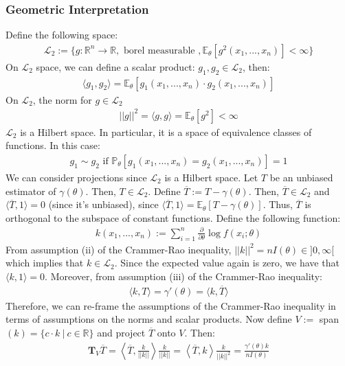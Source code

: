 \documentclass[11pt]{scrartcl}
\newcommand{\R}[0]{\mathbb{R}}
\theoremstyle{definition}
\theoremstyle{remark}
\newcommand{\EXth}[1]{\mathbb{E}_\theta \left[ #1 \right]}
\newcommand{\Ltwo}[0]{\mathcal{L}_2}
\begin{document}
\subsubsection{Geometric Interpretation}
Define the following space: 
\begin{align*} 
	\mathcal{L}_2 := \{ g: \R^n \rightarrow \R, \text{ borel measurable }, \EXth{g^2(x_1,..., x_n)} < \infty  \} 
\end{align*}
On $\Ltwo$ space, we can define a scalar product: $g_1, g_2 \in \Ltwo$, then: 
\begin{align*}
	\langle g_1, g_2 \rangle = \EXth{g_1(x_1, ..., x_n) \cdot g_2 (x_1, ..., x_n) }	
\end{align*}
On $\Ltwo$, the norm for $g \in \Ltwo$
\begin{align*}
		||g||^2 = \langle g, g \rangle = \EXth{g^2} < \infty 
\end{align*}
$\Ltwo$ is a Hilbert space. In particular, it is a space of equivalence classes of functions. In this case: 
\begin{align*}
	g_1 \sim g_2 \text{ if } \mathbb{P}_\theta [ g_1(x_1, ..., x_n) = g_2(x_1,..., x_n)] = 1	
\end{align*}
We can consider projections since $\Ltwo$ is a Hilbert space. Let $T$ be an unbiased estimator of $\gamma (\theta)$. Then, $T \in \Ltwo$.  Define $\overline{T}:= T - \gamma(\theta)$. Then, $\overline{T} \in \Ltwo$ and $\langle \overline{T}, 1 \rangle =0$ (since it's unbiased), since $\langle \overline{T}, 1 \rangle = \EXth{T - \gamma(\theta)}$. Thus, $\overline{T}$ is orthogonal to the subspace of constant functions. Define the following function: 
\begin{align}
	k(x_1, ..., x_n) := \sum_{i=1}^n \frac{\partial}{\partial \theta} \log f(x_i; \theta) 
\end{align}
From assumption (ii) of the Crammer-Rao inequality, $||k||^2 = nI(\theta) \in ]0, \infty[$ which implies that $k \in \Ltwo$. Since the expected value again is zero, we have that $\langle k, 1 \rangle = 0$. Moreover, from assumption (iii) of the Crammer-Rao inequality:
\begin{align*}
	\langle k, T \rangle = \gamma ' (\theta) = \langle k, \overline{T} \rangle 	
\end{align*}
Therefore, we can re-frame the assumptions of the Crammer-Rao inequality in terms of assumptions on the norms and scalar products.  Now define $V:= $ span$(k) = \{ c \cdot  k\ |\ c \in \R \} $ and project $\overline{T}$ onto $V$. Then: 
\begin{align*}
	\mathbf{T}_V \overline{T} = \left\langle \overline{T}, \frac{k}{|| k||} \right\rangle \frac{k}{|| k ||}	 =  \left\langle \overline{T}, k \right\rangle \frac{k}{|| k ||^2} = \frac{\gamma ' (\theta) k}{n I(\theta)}
\end{align*}
\end{document}
